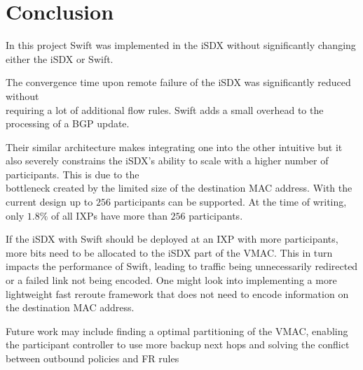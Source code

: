 \chapter{\label{chapter7}Conclusion}
In this project Swift was implemented in the iSDX without significantly changing either the iSDX or Swift.

The convergence time upon remote failure of the iSDX was significantly reduced without \\requiring a lot of additional flow rules. Swift adds a small overhead to the processing of a BGP update. 

Their similar architecture makes integrating one into the other intuitive but it also severely constrains the iSDX's ability to scale with a higher number of participants. This is due to the\\bottleneck created by the limited size of the destination MAC address. With the current design up to $256$ participants can be supported. At the time of writing, only $1.8\%$ of all IXPs have more than $256$ participants. \cite{ixps} 


If the iSDX with Swift should be deployed at an IXP with more participants, more bits need to be allocated to the iSDX part of the VMAC. This in turn impacts the performance of Swift, leading to traffic being unnecessarily redirected or a failed link not being encoded. One might look into implementing a more lightweight fast reroute framework that does not need to encode information on the destination MAC address. 

Future work may include finding a optimal partitioning of the VMAC, enabling the participant controller to use more backup next hops and solving the conflict between outbound policies and FR rules